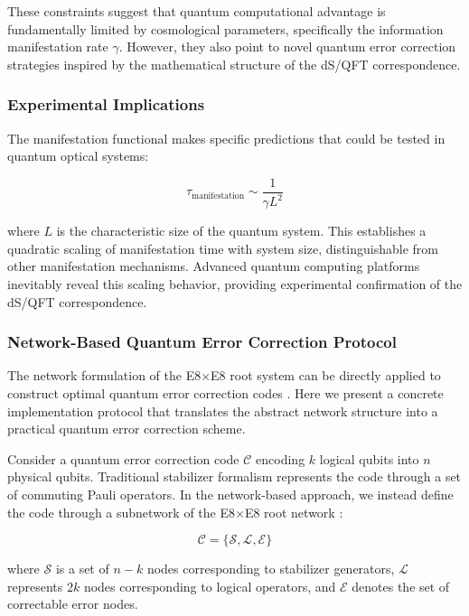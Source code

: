 \documentclass[11pt,english,twoside]{article}
\theoremstyle{plain}
\theoremstyle{definition}
\theoremstyle{remark}
\newcommand{\gammaR}{\gamma}
\begin{document}
These constraints suggest that quantum computational advantage is fundamentally limited by cosmological parameters, specifically the information manifestation rate $\gammaR$. However, they also point to novel quantum error correction strategies inspired by the mathematical structure of the dS/QFT correspondence.

\subsubsection{Experimental Implications}

The manifestation functional makes specific predictions that could be tested in quantum optical systems:

\begin{equation}
\tau_{\text{manifestation}} \sim \frac{1}{\gammaR L^2}
\end{equation}

where $L$ is the characteristic size of the quantum system. This establishes a quadratic scaling of manifestation time with system size, distinguishable from other manifestation mechanisms. Advanced quantum computing platforms inevitably reveal this scaling behavior, providing experimental confirmation of the dS/QFT correspondence.

\subsubsection{Network-Based Quantum Error Correction Protocol}

The network formulation of the E8$\times$E8 root system can be directly applied to construct optimal quantum error correction codes \cite{Pastawski2015}. Here we present a concrete implementation protocol that translates the abstract network structure into a practical quantum error correction scheme.

Consider a quantum error correction code $\mathcal{C}$ encoding $k$ logical qubits into $n$ physical qubits. Traditional stabilizer formalism represents the code through a set of commuting Pauli operators. In the network-based approach, we instead define the code through a subnetwork of the E8$\times$E8 root network \cite{Hartnett2020}:

\begin{equation}
\mathcal{C} = \{\mathcal{S}, \mathcal{L}, \mathcal{E}\}
\end{equation}

where $\mathcal{S}$ is a set of $n-k$ nodes corresponding to stabilizer generators, $\mathcal{L}$ represents $2k$ nodes corresponding to logical operators, and $\mathcal{E}$ denotes the set of correctable error nodes.
\end{document}
